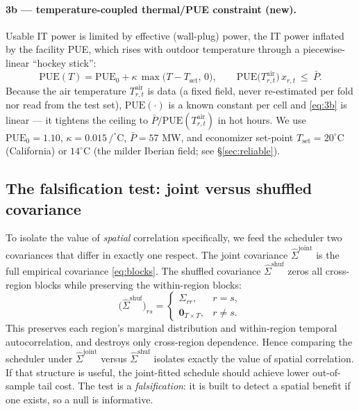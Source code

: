 \documentclass[11pt]{article}
\newcommand{\degC}{^{\circ}\mathrm{C}}
\begin{document}
\paragraph{3b --- temperature-coupled thermal/PUE constraint (new).}
Usable IT power is limited by effective (wall-plug) power, the IT power inflated by the facility PUE,
which rises with outdoor temperature through a piecewise-linear ``hockey stick'':
\begin{equation}
  \mathrm{PUE}(T)=\mathrm{PUE}_0+\kappa\,\max\!\big(T-T_{\mathrm{set}},\,0\big),\qquad
  \mathrm{PUE}\!\big(T^{\mathrm{air}}_{r,t}\big)\,x_{r,t}\ \le\ \bar P.
  \label{eq:3b}
\end{equation}
Because the air temperature $T^{\mathrm{air}}_{r,t}$ is data (a fixed field, never re-estimated per fold
nor read from the test set), $\mathrm{PUE}(\cdot)$ is a known constant per cell and \eqref{eq:3b} is
linear --- it tightens the ceiling to $\bar P/\mathrm{PUE}(T^{\mathrm{air}}_{r,t})$ in hot hours. We use
$\mathrm{PUE}_0=1.10$, $\kappa=0.015\,\mathrm{/}\degC$, $\bar P=57$ MW, and economizer set-point
$T_{\mathrm{set}}=20\degC$ (California) or $14\degC$ (the milder Iberian field; see \S\ref{sec:reliable}).

\subsection{The falsification test: joint versus shuffled covariance}\label{sec:test}
To isolate the value of \emph{spatial} correlation specifically, we feed the scheduler two covariances
that differ in exactly one respect. The joint covariance $\hat\Sigma^{\mathrm{joint}}$ is the full
empirical covariance \eqref{eq:blocks}. The shuffled covariance $\hat\Sigma^{\mathrm{shuf}}$ zeros all
cross-region blocks while preserving the within-region blocks:
\begin{equation}
  \big(\hat\Sigma^{\mathrm{shuf}}\big)_{rs}=
  \begin{cases}\Sigma_{rr}, & r=s,\\ \mathbf{0}_{T\times T}, & r\ne s.\end{cases}
  \label{eq:shuf}
\end{equation}
This preserves each region's marginal distribution and within-region temporal autocorrelation, and
destroys only cross-region dependence. Hence comparing the scheduler under $\hat\Sigma^{\mathrm{joint}}$
versus $\hat\Sigma^{\mathrm{shuf}}$ isolates exactly the value of spatial correlation. If that structure
is useful, the joint-fitted schedule should achieve lower out-of-sample tail cost. The test is a
\emph{falsification}: it is built to detect a spatial benefit if one exists, so a null is informative.
\end{document}

